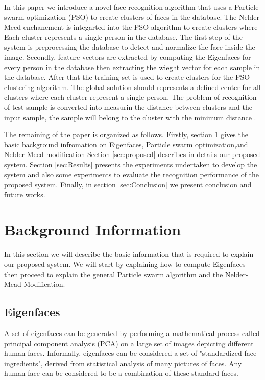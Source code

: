 \documentclass[a4paper,twoside]{article}
\begin{document}
In this paper we introduce a novel face recognition algorithm that uses a Particle swarm optimization (PSO) to create clusters of faces in the database. The Nelder Meed enchancment is integarted into the PSO algorithm to create clusters where Each cluster represents a single person in the database.  The first step of the system is preprocessing the database to detect and normalize the face inside the image. Secondly, feature vectors are extracted by computing the  Eigenfaces for every person in the database then extracting the wieght vector for each sample in the database. After that the training set is used to create clusters for the PSO clustering algorithm. The global solution should represents a defined center for all clusters where each cluster represent a single person. The problem of recognition of test sample is converted into measurin the distance between clusters and the input sample, the  sample will belong to the cluster with the minimum distance . %





The remaining of the paper is organized as follows. Firstly, section \ref{sec:section2} gives the basic background infromation on  Eigenfaces, Particle swarm optimization,and Nelder Meed modification Section \ref{sec:proposed} describes in details our proposed system. Section \ref{sec:Results} presents the experiments undertaken to develop the system and also some experiments to evaluate the recognition performance of the proposed system. Finally, in section \ref{sec:Conclusion} we present conclusion and future works.

\section{Background Information}
\label{sec:section2}
In this section we will describe the basic information that is required to explain our proposed system.  We will start by explaining how to compute Eigenfaces then proceed to explain the general Particle swarm algorithm and the Nelder-Mead Modification.

\subsection{Eigenfaces}
\label{facereg}
A set of eigenfaces \cite{Turk91} can be generated by performing a mathematical process called principal component analysis (PCA) on a large set of images depicting different human faces. Informally, eigenfaces can be considered a set of "standardized face ingredients", derived from statistical analysis of many pictures of faces. Any human face can be considered to be a combination of these standard faces.
\end{document}
